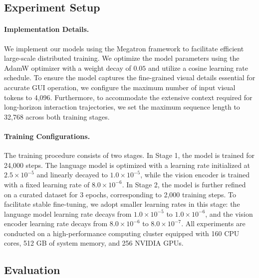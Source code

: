 \documentclass{article}
\theoremstyle{plain}
\theoremstyle{definition}
\theoremstyle{remark}
\begin{document}
\subsection{Experiment Setup}

\paragraph{Implementation Details.} We implement our models using the Megatron framework to facilitate efficient large-scale distributed training. We optimize the model parameters using the AdamW optimizer with a weight decay of $0.05$ and utilize a cosine learning rate schedule. To ensure the model captures the fine-grained visual details essential for accurate GUI operation, we configure the maximum number of input visual tokens to 4,096. Furthermore, to accommodate the extensive context required for long-horizon interaction trajectories, we set the maximum sequence length to 32,768 across both training stages.

\paragraph{Training Configurations.} The training procedure consists of two stages. In Stage 1, the model is trained for 24,000 steps. The language model is optimized with a learning rate initialized at $2.5 \times 10^{-5}$ and linearly decayed to $1.0 \times 10^{-5}$, while the vision encoder is trained with a fixed learning rate of $8.0 \times 10^{-6}$.
In Stage 2, the model is further refined on a curated dataset for 3 epochs, corresponding to 2,000 training steps. To facilitate stable fine-tuning, we adopt smaller learning rates in this stage: the language model learning rate decays from $1.0 \times 10^{-5}$ to $1.0 \times 10^{-6}$, and the vision encoder learning rate decays from $8.0 \times 10^{-6}$ to $8.0 \times 10^{-7}$.
All experiments are conducted on a high-performance computing cluster equipped with 160 CPU cores, 512 GB of system memory, and 256 NVIDIA GPUs.

\subsection{Evaluation}
\end{document}
